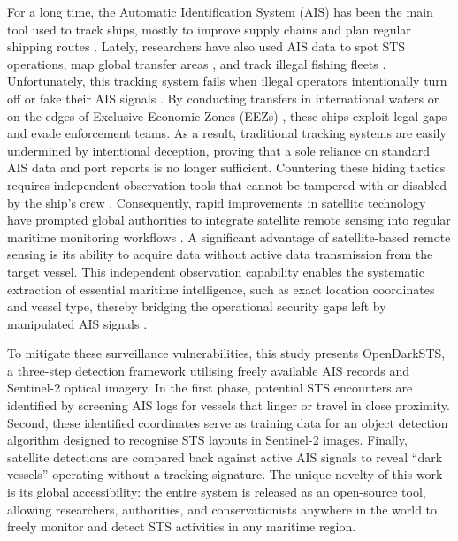 \documentclass[10pt, letterpaper, twocolumn]{article}
\begin{document}
For a long time, the Automatic Identification System (AIS) has been the main tool used to track ships, mostly to improve supply chains and plan regular shipping routes \autocite{herzog2025}. Lately, researchers have also used AIS data to spot STS operations, map global transfer areas \autocite{boerder2018}, and track illegal fishing fleets \autocite{miller2018, saito2022}. Unfortunately, this tracking system fails when illegal operators intentionally turn off or fake their AIS signals \autocite{bernabe2024}. By conducting transfers in international waters or on the edges of Exclusive Economic Zones (EEZs) \autocite{miller2018}, these ships exploit legal gaps and evade enforcement teams. As a result, traditional tracking systems are easily undermined by intentional deception, proving that a sole reliance on standard AIS data and port reports is no longer sufficient. Countering these hiding tactics requires independent observation tools that cannot be tampered with or disabled by the ship's crew \autocite{androjna2021}. Consequently, rapid improvements in satellite technology have prompted global authorities to integrate satellite remote sensing into regular maritime monitoring workflows \autocite{li2020}. A significant advantage of satellite-based remote sensing is its ability to acquire data without active data transmission from the target vessel. This independent observation capability enables the systematic extraction of essential maritime intelligence, such as exact location coordinates and vessel type, thereby bridging the operational security gaps left by manipulated AIS signals \autocite{paolo2024}.

To mitigate these surveillance vulnerabilities, this study presents OpenDarkSTS, a three-step detection framework utilising freely available AIS records and Sentinel-2 optical imagery. In the first phase, potential STS encounters are identified by screening AIS logs for vessels that linger or travel in close proximity. Second, these identified coordinates serve as training data for an object detection algorithm designed to recognise STS layouts in Sentinel-2 images. Finally, satellite detections are compared back against active AIS signals to reveal ``dark vessels'' operating without a tracking signature. The unique novelty of this work is its global accessibility: the entire system is released as an open-source tool, allowing researchers, authorities, and conservationists anywhere in the world to freely monitor and detect STS activities in any maritime region.

\end{document}
